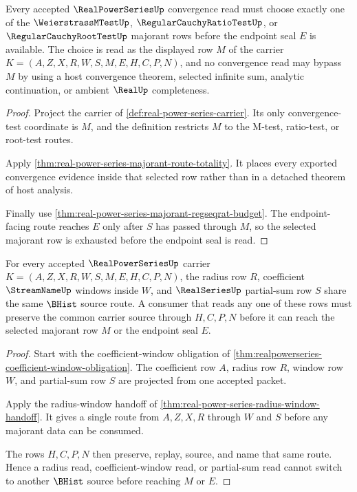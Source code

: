 \begin{theorem}\label{thm:realpowerseries-majorant-exhaustion}
Every accepted $\RealPowerSeriesUp$ convergence read must choose exactly one of the $\WeierstrassMTestUp$, $\RegularCauchyRatioTestUp$, or $\RegularCauchyRootTestUp$ majorant rows before the endpoint seal $E$ is available. The choice is read as the displayed row $M$ of the carrier $K=(A,Z,X,R,W,S,M,E,H,C,P,N)$, and no convergence read may bypass $M$ by using a host convergence theorem, selected infinite sum, analytic continuation, or ambient $\RealUp$ completeness.
\end{theorem}
\begin{proof}
Project the carrier of \autoref{def:real-power-series-carrier}. Its only convergence-test coordinate is $M$, and the definition restricts $M$ to the M-test, ratio-test, or root-test routes.

Apply \autoref{thm:real-power-series-majorant-route-totality}. It places every exported convergence evidence inside that selected row rather than in a detached theorem of host analysis.

Finally use \autoref{thm:real-power-series-majorant-regseqrat-budget}. The endpoint-facing route reaches $E$ only after $S$ has passed through $M$, so the selected majorant row is exhausted before the endpoint seal is read.
\end{proof}

\begin{theorem}\label{thm:realpowerseries-radius-source-compatibility}
For every accepted $\RealPowerSeriesUp$ carrier $K=(A,Z,X,R,W,S,M,E,H,C,P,N)$, the radius row $R$, coefficient $\StreamNameUp$ windows inside $W$, and $\RealSeriesUp$ partial-sum row $S$ share the same $\BHist$ source route. A consumer that reads any one of these rows must preserve the common carrier source through $H,C,P,N$ before it can reach the selected majorant row $M$ or the endpoint seal $E$.
\end{theorem}
\begin{proof}
Start with the coefficient-window obligation of \autoref{thm:realpowerseries-coefficient-window-obligation}. The coefficient row $A$, radius row $R$, window row $W$, and partial-sum row $S$ are projected from one accepted packet.

Apply the radius-window handoff of \autoref{thm:real-power-series-radius-window-handoff}. It gives a single route from $A,Z,X,R$ through $W$ and $S$ before any majorant data can be consumed.

The rows $H,C,P,N$ then preserve, replay, source, and name that same route. Hence a radius read, coefficient-window read, or partial-sum read cannot switch to another $\BHist$ source before reaching $M$ or $E$.
\end{proof}

